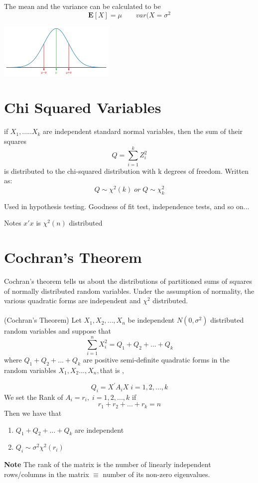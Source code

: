 The mean and the variance can be calculated to be 
\[
\textbf{E}[X] = \mu \qquad var(X=\sigma^2
\]
\begin{center}
\includegraphics{Images/NormalDist.png}

\end{center}

\section{Chi Squared Variables} 

if $X_1,.....X_k$ are independent standard normal variables, then the sum of their squares 
\[
Q = \sum_{i=1}^k Z_i^2
\]
is distributed to the chi-squared distribution with k degrees of freedom. Written as:
\[
Q \sim \chi^2(k) \; or \; Q \sim \chi_k^2
\]

Used in hypothesis testing. Goodness of fit test, independence tests, and so on...


Notes $x'x$ is $\chi^2(n)$ distributed

\section{Cochran's Theorem} 
Cochran's theorem tells us about the distributions of partitioned sums of squares of normally distributed random variables. Under the assumption of normality, the various quadratic forms are independent and $\chi^2$ distributed.\\
\\
\bTheorem (Cochran's Theorem) 
Let $X_1, X_2,...,X_n $ be independent  $N(0,\sigma^2)$ distributed random variables and suppose that 
\[
\sum_{i=1}^n X_i^2 = Q_1 +Q_2+...+Q_k
\]
where $Q_1 +Q_2+...+Q_k$ are positive semi-definite quadratic forms in the random variables $X_1, X_2...,X_n, $that is ,

\[
Q_i = X^{'}A_i X \; i = 1,2,...,k
\]
We set the Rank of $A_i=r_i, \; i=1,2,...,k$ if 
\[
r_1+r_2+...+r_k =n
\]
Then we have that 
\begin{enumerate}
\item $Q_1 +Q_2+...+Q_k$ are independent
\item $Q_i \sim \sigma^2\chi^2(r_i)$
\end{enumerate}
\eTheorem
\textbf{Note} The rank of the matrix is the number of linearly independent rows/columns in the matrix $\equiv$ number of its non-zero eigenvalues.


